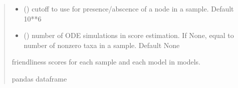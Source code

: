 \documentclass[letterpaper,10pt,english]{sphinxmanual}
\begin{document}
\begin{fulllineitems}
\begin{quote}
\begin{description}
\begin{itemize}
\item {} 
\sphinxAtStartPar
{} () \textendash{} cutoff to use for presence/abscence of a node in a sample. Default 10**\sphinxhyphen{}6

\item {} 
\sphinxAtStartPar
{} () \textendash{} number of ODE simulations in score estimation. If None, equal to number of non\sphinxhyphen{}zero taxa in a sample. Default None

\end{itemize}

\sphinxAtStartPar
friendliness scores for each sample and each model in models.

\sphinxAtStartPar
pandas dataframe

\end{description}\end{quote}

\end{fulllineitems}

\end{document}
